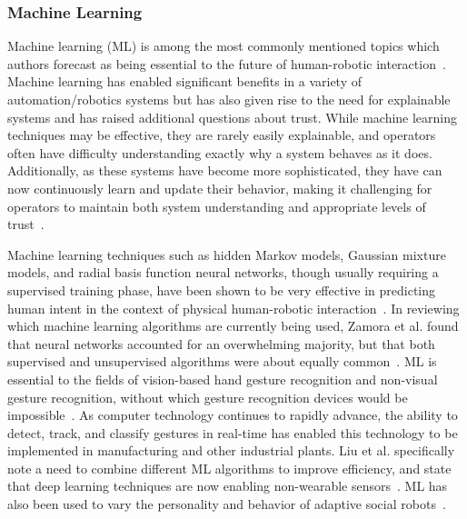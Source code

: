 \subsubsection{Machine Learning}
Machine learning (ML) is among the most commonly mentioned topics which authors forecast as being essential to the future of human-robotic interaction~\citep{wang_current_2018}.
Machine learning has enabled significant benefits in a variety of automation/robotics systems but has also given rise to the need for explainable systems and has raised additional questions about trust.
While machine learning techniques may be effective, they are rarely easily explainable, and operators often have difficulty understanding exactly why a system behaves as it does.
Additionally, as these systems have become more sophisticated, they have can now continuously learn and update their behavior, making it challenging for operators to maintain both system understanding and appropriate levels of trust~\citep{chen_humanagent_2014}.

Machine learning techniques such as hidden Markov models, Gaussian mixture models, and radial basis function neural networks, though usually requiring a supervised training phase, have been shown to be very effective in predicting human intent in the context of physical human-robotic interaction~\citep{losey_review_2018}.
In reviewing which machine learning algorithms are currently being used, Zamora et al. found that neural networks accounted for an overwhelming majority, but that both supervised and unsupervised algorithms were about equally common~\citep{zamora_machine_2017}.
ML is essential to the fields of vision-based hand gesture recognition and non-visual gesture recognition, without which gesture recognition devices would be impossible~\citep{liu_gesture_2018, rautaray_vision_2015, 8701742}.
As computer technology continues to rapidly advance, the ability to detect, track, and classify gestures in real-time has enabled this technology to be implemented in manufacturing and other industrial plants.
Liu et al. specifically note a need to combine different ML algorithms to improve efficiency, and state that deep learning techniques are now enabling non-wearable sensors~\citep{liu_gesture_2018}.
ML has also been used to vary the personality and behavior of adaptive social robots~\citep{ahmad_systematic_2017}.

